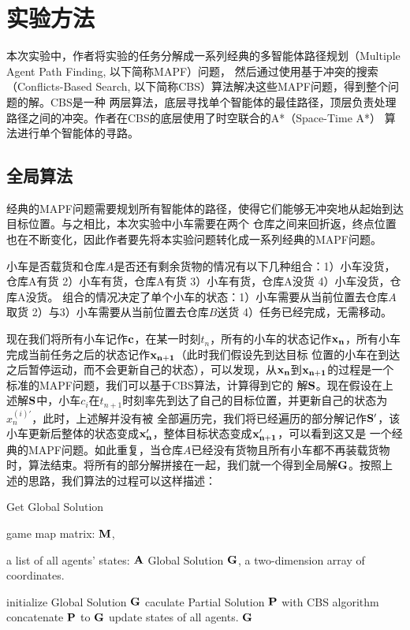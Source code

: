 \documentclass[UTF8]{ctexart}  %
\begin{document}
\section{实验方法}
本次实验中，作者将实验的任务分解成一系列经典的多智能体路径规划（Multiple Agent Path Finding, 以下简称MAPF）问题，
然后通过使用基于冲突的搜索（Conflicts-Based Search, 以下简称CBS）算法解决这些MAPF问题，得到整个问题的解。CBS是一种
两层算法，底层寻找单个智能体的最佳路径，顶层负责处理路径之间的冲突。作者在CBS的底层使用了时空联合的A*（Space-Time A*）
算法进行单个智能体的寻路。
\subsection{全局算法}
经典的MAPF问题需要规划所有智能体的路径，使得它们能够无冲突地从起始到达目标位置。与之相比，本次实验中小车需要在两个
仓库之间来回折返，终点位置也在不断变化，因此作者要先将本实验问题转化成一系列经典的MAPF问题。

小车是否载货和仓库$A$是否还有剩余货物的情况有以下几种组合：1）小车没货，仓库A有货 2）小车有货，仓库A有货 3）小车有货，仓库A没货 4）小车没货，仓库A没货。
组合的情况决定了单个小车的状态：1）小车需要从当前位置去仓库$A$取货 2）与3）小车需要从当前位置去仓库$B$送货 4）任务已经完成，无需移动。

现在我们将所有小车记作$\bf c$，在某一时刻$t_n$，所有的小车的状态记作$\bf x_n$，所有小车完成当前任务之后的状态记作$\bf x_{n+1}$（此时我们假设先到达目标
位置的小车在到达之后暂停运动，而不会更新自己的状态），可以发现，从$\bf x_n$到$\bf x_{n+1}$的过程是一个标准的MAPF问题，我们可以基于CBS算法，计算得到它的
解$\bf S$。现在假设在上述解$\bf S$中，小车$c_i$在$t_{n+1}$时刻率先到达了自己的目标位置，并更新自己的状态为$\displaystyle x_n^{(i)\prime}$，此时，上述解并没有被
全部遍历完，我们将已经遍历的部分解记作$\bf S^{\prime}$，该小车更新后整体的状态变成$\bf x_n^{\prime}$，整体目标状态变成$\bf x_{n+1}^{\prime}$，可以看到这又是
一个经典的MAPF问题。如此重复，当仓库$A$已经没有货物且所有小车都不再装载货物时，算法结束。将所有的部分解拼接在一起，我们就一个得到全局解$\bf G$。按照上述的思路，我们算法的过程可以这样描述：

\begin{algorithm}[H]
    \renewcommand{\algorithmicrequire}{\textbf{Input:}}
	\renewcommand{\algorithmicensure}{\textbf{Output:}}
    \caption{Get Global Solution}
    \label{alg:example}
    \begin{algorithmic}[1]
        \REQUIRE 

            game map matrix: $\bf M$,

            a list of all agents' states: $\bf A$
        \ENSURE
            Global Solution $\bf G$, a two-dimension array of coordinates.

        \STATE initialize Global Solution $\bf G$  
            \STATE caculate Partial Solution $\bf P$ with CBS algorithm
            \STATE concatenate $\bf P $ to $\bf G$
            \STATE update states of all agents.
        \ENDWHILE
        \RETURN $\bf G$
    \end{algorithmic}
\end{algorithm}
\end{document}
